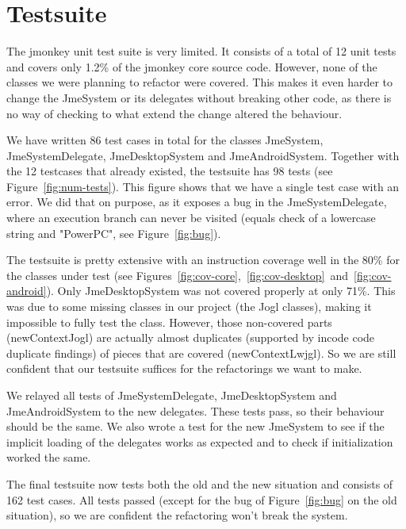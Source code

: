 \documentclass[a4paper, 10pt]{article}
\begin{document}
\section{Testsuite}
\label{sec:testsuite}
The jmonkey unit test suite is very limited.
It consists of a total of 12 unit tests and covers only 1.2\% of the jmonkey core source code.
However, none of the classes we were planning to refactor were covered.
This makes it even harder to change the JmeSystem or its delegates without breaking other code,
as there is no way of checking to what extend the change altered the behaviour.

We have written 86 test cases in total for the classes JmeSystem, JmeSystemDelegate, JmeDesktopSystem and JmeAndroidSystem.
Together with the 12 testcases that already existed, the testsuite has 98 tests (see Figure~\ref{fig:num-tests}).
This figure shows that we have a single test case with an error.
We did that on purpose, as it exposes a bug in the JmeSystemDelegate, 
where an execution branch can never be visited (equals check of a lowercase string and "PowerPC", see Figure~\ref{fig:bug}).

The testsuite is pretty extensive with an instruction coverage well in the 80\% for the classes under test (see Figures~\ref{fig:cov-core},~\ref{fig:cov-desktop}~and~\ref{fig:cov-android}).
Only JmeDesktopSystem was not covered properly at only 71\%. 
This was due to some missing classes in our project (the Jogl classes),
making it impossible to fully test the class. 
However, those non-covered parts (newContextJogl) are actually almost duplicates (supported by incode code duplicate findings) of pieces that are covered (newContextLwjgl).
So we are still confident that our testsuite suffices for the refactorings we want to make.

We relayed all tests of JmeSystemDelegate, JmeDesktopSystem and JmeAndroidSystem to the new delegates.
These tests pass, so their behaviour should be the same.
We also wrote a test for the new JmeSystem to see if the implicit loading of the delegates works as expected and to check if initialization worked the same.

The final testsuite now tests both the old and the new situation and consists of 162 test cases.
All tests passed (except for the bug of Figure~\ref{fig:bug} on the old situation), 
so we are confident the refactoring won't break the system.
\end{document}
